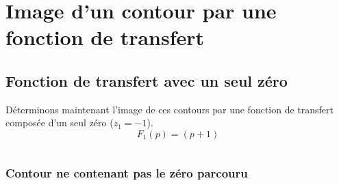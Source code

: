 \section{Image d'un contour par une fonction de transfert
\label{image-dun-contour-par-une-fonction-de-transfert}}
\subsection{Fonction de transfert avec un seul zéro
\label{fonction-de-transfert-avec-un-seul-zuxe9ro}}
Déterminons maintenant l'image de ces contours par une fonction de
transfert composée d'un seul zéro (\(z_1=-1\)).
\[
F_1(p)=(p+1)
\]
\begin{tcolorbox}[breakable, size=fbox, boxrule=1pt, 
    pad at break*=1mm,colback=cellbackground, colframe=cellborder]
\inputminted{python}{codes/python/annexe_cauchy_cellule6.py}
\end{tcolorbox}
\subsubsection{Contour ne contenant pas le zéro parcouru
\label{contour-nentourant-pas-le-zuxe9ro-parcouru}}
